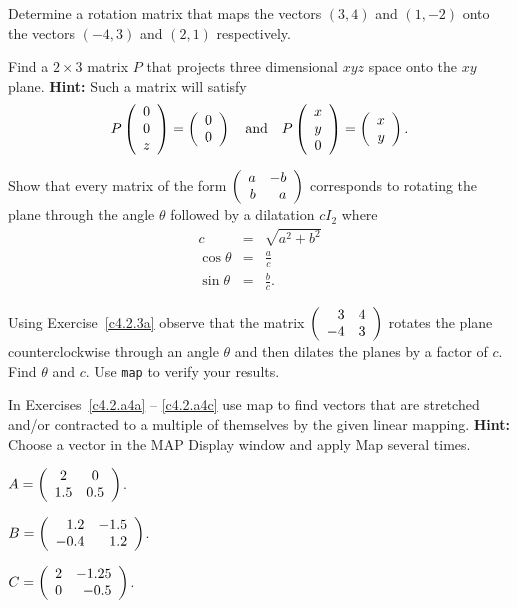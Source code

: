 \begin{exercise} \label{c7.8.2}
Determine a rotation matrix that maps the vectors $(3,4)$ and
$(1,-2)$ onto the vectors $(-4,3)$ and $(2,1)$ respectively.
\end{exercise}



\begin{exercise} \label{c4.2.3}
Find a $2\times 3$ matrix $P$ that projects three dimensional $xyz$ space onto
the $xy$ plane.  {\bf Hint:} Such a matrix will satisfy
\[
P\left(\begin{array}{c} 0 \\ 0 \\ z \end{array}\right) = \left(\begin{array}{r} 0 \\ 0\end{array}\right)
\quad\mbox{and}\quad
P\left(\begin{array}{c} x \\ y \\ 0 \end{array}\right) = \left(\begin{array}{r} x \\ y\end{array}\right).
\]
\end{exercise}

\begin{exercise}	\label{c4.2.3a}
Show that every matrix of the form $\left(\begin{array}{rr} a & -b\\ b &a\end{array}\right)$ corresponds to
rotating the plane through the angle $\theta$ followed by a dilatation 
$cI_2$ where
\begin{eqnarray*}
c & = & \sqrt{a^2+b^2}\\
\cos\theta & = & \frac{a}{c} \\
\sin\theta & = & \frac{b}{c}.
\end{eqnarray*}
\end{exercise}

\begin{exercise}  \label{c4.2.3b}
Using Exercise~\ref{c4.2.3a} observe that the matrix
$\left(\begin{array}{rr} 3 & 4\\ -4 &3\end{array}\right)$ rotates the plane counterclockwise through
an angle $\theta$ and then dilates the planes by a factor of $c$.
Find $\theta$ and $c$.  Use {\tt map} to verify your results.
\end{exercise}


\CEXER


\noindent In Exercises~\ref{c4.2.a4a} -- \ref{c4.2.a4c} use {\sf map} to
find vectors that are stretched and/or contracted to a multiple of
themselves by the given linear mapping.  {\bf Hint:}  Choose a vector in the
{\sf MAP Display} window and apply {\sf Map} several times.
\begin{exercise} \label{c4.2.a4a}
$A=\left(\begin{array}{cc} 2 & 0\\ 1.5 &0.5\end{array}\right)$.
\end{exercise}
\begin{exercise} \label{c4.2.a4b}
$B=\left(\begin{array}{rr} 1.2 & -1.5\\ -0.4 &1.2\end{array}\right)$.
\end{exercise}
\begin{exercise} \label{c4.2.a4c}
$C=\left(\begin{array}{rr} 2 & -1.25\\ 0 &-0.5\end{array}\right)$.
\end{exercise}

